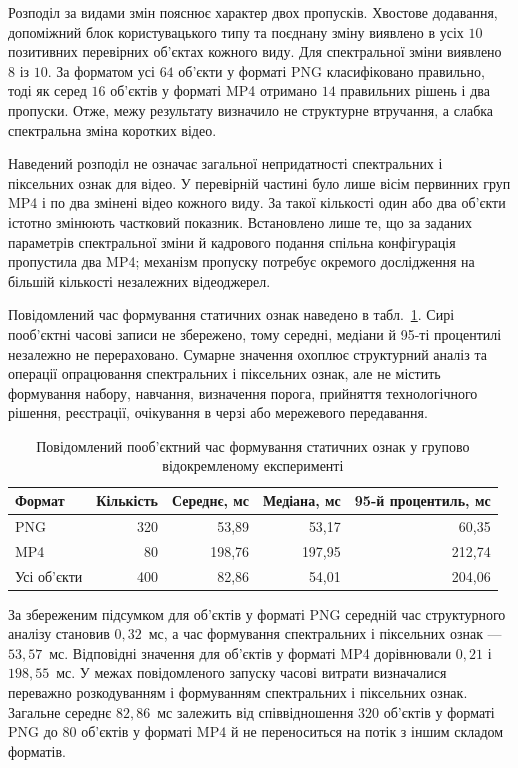 Розподіл за видами змін пояснює характер двох пропусків. Хвостове додавання, допоміжний блок користувацького типу та поєднану зміну виявлено в усіх $10$ позитивних перевірних об’єктах кожного виду. Для спектральної зміни виявлено $8$ із $10$. За форматом усі $64$ об’єкти у форматі PNG класифіковано правильно, тоді як серед $16$ об’єктів у форматі MP4 отримано $14$ правильних рішень і два пропуски. Отже, межу результату визначило не структурне втручання, а слабка спектральна зміна коротких відео.

Наведений розподіл не означає загальної непридатності спектральних і піксельних ознак для відео. У перевірній частині було лише вісім первинних груп MP4 і по два змінені відео кожного виду. За такої кількості один або два об’єкти істотно змінюють частковий показник. Встановлено лише те, що за заданих параметрів спектральної зміни й кадрового подання спільна конфігурація пропустила два MP4; механізм пропуску потребує окремого дослідження на більшій кількості незалежних відеоджерел.

Повідомлений час формування статичних ознак наведено в табл.~\ref{tab:ch4_ind_svs_timing}. Сирі пооб’єктні часові записи не збережено, тому середні, медіани й 95-ті процентилі незалежно не перераховано. Сумарне значення охоплює структурний аналіз та операції опрацювання спектральних і піксельних ознак, але не містить формування набору, навчання, визначення порога, прийняття технологічного рішення, реєстрації, очікування в черзі або мережевого передавання.

\begin{table}[htbp]
\caption{Повідомлений пооб’єктний час формування статичних ознак у групово відокремленому експерименті}
\label{tab:ch4_ind_svs_timing}
\centering
\small
\begin{tabular}{lrrrr}
\toprule
Формат & Кількість & Середнє, мс & Медіана, мс & 95-й процентиль, мс \\
\midrule
PNG & 320 & 53,89 & 53,17 & 60,35 \\
MP4 & 80 & 198,76 & 197,95 & 212,74 \\
\midrule
Усі об’єкти & 400 & 82,86 & 54,01 & 204,06 \\
\bottomrule
\end{tabular}
\end{table}

За збереженим підсумком для об’єктів у форматі PNG середній час структурного аналізу становив $0{,}32$~мс, а час формування спектральних і піксельних ознак --- $53{,}57$~мс. Відповідні значення для об’єктів у форматі MP4 дорівнювали $0{,}21$ і $198{,}55$~мс. У межах повідомленого запуску часові витрати визначалися переважно розкодуванням і формуванням спектральних і піксельних ознак. Загальне середнє $82{,}86$~мс залежить від співвідношення $320$ об’єктів у форматі PNG до $80$ об’єктів у форматі MP4 й не переноситься на потік з іншим складом форматів.


